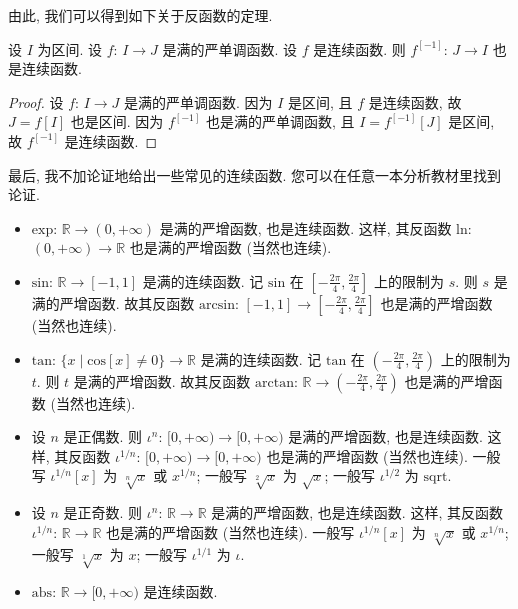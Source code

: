 由此, 我们可以得到如下关于反函数的定理.

\begin{theorem}
    设 $I$ 为区间. 设 $f$: $I \to J$ 是满的严单调函数. 设 $f$ 是连续函数. 则 $f^{[-1]}$: $J \to I$ 也是连续函数.
\end{theorem}

\begin{proof}
    设 $f$: $I \to J$ 是满的严单调函数. 因为 $I$ 是区间, 且 $f$ 是连续函数, 故 $J = f[I]$ 也是区间. 因为 $f^{[-1]}$ 也是满的严单调函数, 且 $I = f^{[-1]} [J]$ 是区间, 故 $f^{[-1]}$ 是连续函数.
\end{proof}

最后, 我不加论证地给出一些常见的连续函数. 您可以在任意一本分析教材里找到论证.
\begin{itemize}
    \item $\mathrm{exp}$: $\mathbb{R} \to (0, +\infty)$ 是满的严增函数, 也是连续函数. 这样, 其反函数 $\mathrm{ln}$: $(0, +\infty) \to \mathbb{R}$ 也是满的严增函数 (当然也连续).
    \item $\mathrm{sin}$: $\mathbb{R} \to [-1, 1]$ 是满的连续函数. 记 $\mathrm{sin}$ 在 $[-\frac{2\pi}{4}, \frac{2\pi}{4}]$ 上的限制为 $s$. 则 $s$ 是满的严增函数. 故其反函数 $\mathrm{arcsin}$: $[-1, 1] \to [-\frac{2\pi}{4}, \frac{2\pi}{4}]$ 也是满的严增函数 (当然也连续).
    \item $\mathrm{tan}$: $\{ x \mid \mathrm{cos}[x] \neq 0 \} \to \mathbb{R}$ 是满的连续函数. 记 $\mathrm{tan}$ 在 $(-\frac{2\pi}{4}, \frac{2\pi}{4})$ 上的限制为 $t$. 则 $t$ 是满的严增函数. 故其反函数 $\mathrm{arctan}$: $\mathbb{R} \to (-\frac{2\pi}{4}, \frac{2\pi}{4})$ 也是满的严增函数 (当然也连续).
    \item 设 $n$ 是正偶数. 则 $\iota^n$: $[0, +\infty) \to [0, +\infty)$ 是满的严增函数, 也是连续函数. 这样, 其反函数 $\iota^{1/n}$: $[0, +\infty) \to [0, +\infty)$ 也是满的严增函数 (当然也连续). 一般写 $\iota^{1/n} [x]$ 为 $\sqrt[n]{x}$ 或 $x^{1/n}$; 一般写 $\sqrt[2]{x}$ 为 $\sqrt{x}$; 一般写 $\iota^{1/2}$ 为 $\mathrm{sqrt}$.
    \item 设 $n$ 是正奇数. 则 $\iota^n$: $\mathbb{R} \to \mathbb{R}$ 是满的严增函数, 也是连续函数. 这样, 其反函数 $\iota^{1/n}$: $\mathbb{R} \to \mathbb{R}$ 也是满的严增函数 (当然也连续). 一般写 $\iota^{1/n} [x]$ 为 $\sqrt[n]{x}$ 或 $x^{1/n}$; 一般写 $\sqrt[1]{x}$ 为 $x$; 一般写 $\iota^{1/1}$ 为 $\iota$.
    \item $\mathrm{abs}$: $\mathbb{R} \to [0, +\infty)$ 是连续函数.
\end{itemize}

